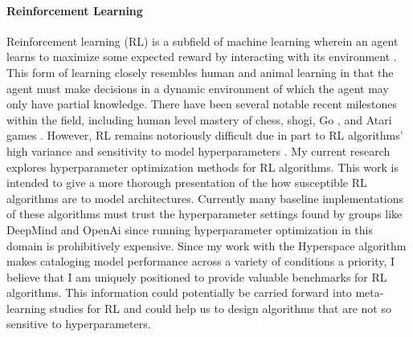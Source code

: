\paragraph{Reinforcement Learning}
Reinforcement learning (RL) is a subfield of machine learning wherein an agent learns to maximize some expected reward by interacting with its environment \cite{Sutton:1998, Recht:Tour}. This form of learning closely resembles human and animal learning in that the agent must make decisions in a dynamic environment of which the agent may only have partial knowledge. There have been several notable recent milestones within the field, including human level mastery of chess, shogi, Go \cite{Silver1140}, and Atari games \cite{Mnih:Atari}. However, RL remains notoriously difficult due in part to RL algorithms' high variance and sensitivity to model hyperparameters \cite{Henderson:RLMatters, MachadoBTVHB18}. My current research explores hyperparameter optimization methods for RL algorithms. This work is intended to give a more thorough presentation of the how susceptible RL algorithms are to model architectures. Currently many baseline implementations of these algorithms must trust the hyperparameter settings found by groups like DeepMind and OpenAi since running hyperparameter optimization in this domain is prohibitively expensive. Since my work with the Hyperspace algorithm makes cataloging model performance across a variety of conditions a priority, I believe that I am uniquely positioned to provide valuable benchmarks for RL algorithms. This information could potentially be carried forward into meta-learning studies for RL and could help us to design algorithms that are not so sensitive to hyperparameters.